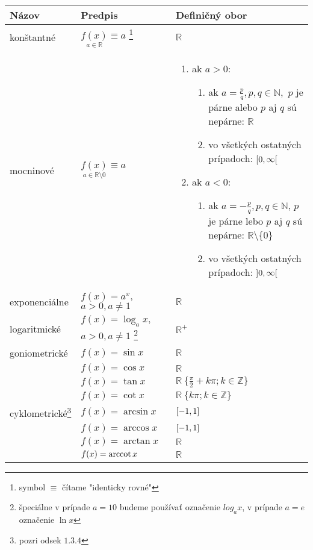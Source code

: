 \noindent
\begin{tabular}{|p{}|p{}|p{}|}
  \hline
  {\bf Názov} & {\bf Predpis} & {\bf Definičný obor} \\
  \hline
  konštantné &
  $\underset{a \in \mathbb{R}}{f(x)}\equiv a$
  \footnote{symbol $\equiv$ čítame "identicky rovné" } &
  $\mathbb{R}$ \\
  mocninové &
  $\underset{a \in \mathbb{R} \setminus {0}}{f(x)}\equiv a$ &
  \begin{enumerate}[leftmargin=0.5cm]
    \item ak $a>0$:
      \begin{enumerate}[leftmargin=0.5cm]
        \item ak $a=\frac{p}{q},p,q\in\mathbb{N},$ $p$ je párne alebo $p$ aj $q$
              sú nepárne: $\mathbb{R}$
        \item vo všetkých ostatných prípadoch: $\interval[open right]{0}{\infty}$
      \end{enumerate}
    \item ak $a<0$:
      \begin{enumerate}[leftmargin=0.5cm]
        \item ak $a=-\frac{p}{q},p,q\in\mathbb{N}$, $p$ je párne lebo $p$ aj $q$
              sú nepárne: $\mathbb{R} \setminus \{0\}$
        \item vo všetkých ostatných prípadoch: $\interval[open]{0}{\infty}$
      \end{enumerate}
  \end{enumerate}
  \\
  exponenciálne
    & $f(x)=a^x, $\newline$ a>0,a\neq 1$
    & $\mathbb{R}$ \\
  logaritmické
    & $f(x)=\log_a x,$\newline$ a>0,a\neq 1$
    \footnote{špeciálne v prípade $a=10$ budeme používať označenie $log_a x$, v prípade $a=e$ označenie $\ln x$}
    & $\mathbb{R}^{+}$\\
  goniometrické & $f(x)=\sin x$ & $\mathbb{R}$ \\
    & $f(x)=\cos x$ & $\mathbb{R}$ \\
    & $f(x)=\tan x$ & $\mathbb{R}\ \{\frac{\pi}{2}+k\pi;k\in\mathbb{Z}\}$ \\
    & $f(x)=\cot x$ & $\mathbb{R}\ \{k\pi;k\in\mathbb{Z}\}$ \\
  cyklometrické\footnote{pozri odsek $1.3.4$}
    & $f(x)=\arcsin x$ & $\interval{-1}{1}$ \\
    & $f(x)=\arccos x$ & $\interval{-1}{1}$ \\
    & $f(x)=\arctan x$ & $\mathbb{R}$ \\
    & $f(x)=\operatorname{arccot} x$ & $\mathbb{R}$ \\
  \hline
\end{tabular}

